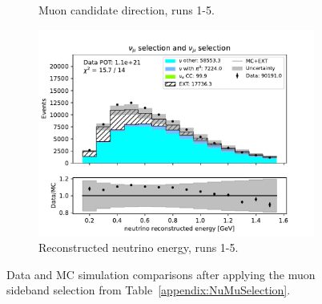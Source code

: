 \begin{figure}[H]
\begin{subfigure}{0.33\linewidth}
        \caption{Muon candidate direction, runs 1-5.}
    \end{subfigure}%
    \begin{subfigure}{0.33\linewidth}
        \captionsetup{width=0.7\linewidth}
        \includegraphics[width=\linewidth]{technote/Sidebands/Figures/NuMuSideband/muon_sideband_neutrino_energy_run1234b4c4d5_NUMU_NUMU.pdf}
        \caption{Reconstructed neutrino energy, runs 1-5.}
    \end{subfigure}
    \caption{Data and MC simulation comparisons after applying the muon sideband selection from Table~\ref{appendix:NuMuSelection}.}
    \label{fig:NuMuSideband}
\end{figure}